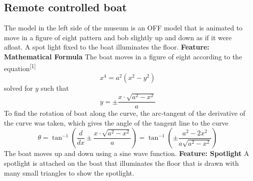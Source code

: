 \documentclass[10pt, oneside]{article}   	%
\begin{document}
\subsection{Remote controlled boat}
The model in the left side of the museum is an OFF model that is animated to move in a figure of eight pattern and bob slightly up and down as if it were afloat.  A spot light fixed to the boat illuminates the floor.
\newline
\newline
\textbf{Feature: Mathematical Formula}\hspace{3mm} The boat moves in a figure of eight according to the equation\textsuperscript{[1]} 
\begin{equation}
x^4 = a^2(x^2-y^2)
\end{equation}
solved for $y$ such that
\begin{equation}
y = \pm \frac{x \cdot \sqrt{a^2 - x^2}}{a}
\end{equation}
To find the rotation of boat along the curve, the arc-tangent of the derivative of the curve was taken, which gives the angle of the tangent line to the curve
\begin{equation}
\theta  =  \tan^{-1}\left( \frac{d}{dx} \pm \frac{x \cdot \sqrt{a^2 - x^2}}{a} \right)  =  \tan^{-1}\left(  \pm \frac{a^2 - 2x^2}{a \sqrt{a^2 - x^2}} \right)
\end{equation}
The boat moves up and down using a sine wave function.
\newline
\newline
\textbf{Feature: Spotlight}\hspace{3mm} A spotlight is attached on the boat that illuminates the floor that is drawn with many small triangles to show the spotlight.


\end{document}
